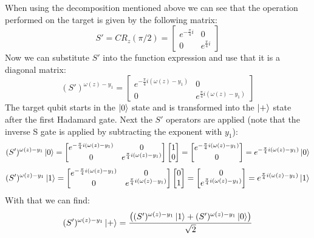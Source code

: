 \documentclass[12pt,a4paper]{article}
\begin{document}
When using the decomposition mentioned above we can see that the operation performed on the target is given by the following matrix:
\[
    S' = CR_z(\pi/2) = \begin{bmatrix}
        e^{-\frac{\pi}{4} i}  & 0\\
        0 & e^{\frac{\pi}{4} i}
    \end{bmatrix}
\]
Now we can substitute \(S'\) into the function expression and use that it is a diagonal matrix:
\[
    (S')^{\omega(z)-y_1} = 
    \begin{bmatrix}
        e^{-\frac{\pi}{4} i(\omega(z)-y_1)}  & 0\\
        0 & e^{\frac{\pi}{4} i(\omega(z)-y_1)}
    \end{bmatrix}
\]
The target qubit starts in the \(\ket{0}\) state and is transformed into the \(\ket{+}\) state after the first Hadamard gate. Next the \(S'\) operators are applied (note that the inverse S gate is applied by subtracting the exponent with \(y_1\)):
\[
(S')^{\omega(z)-y_1}\ket{0} =     \begin{bmatrix}
        e^{-\frac{\pi}{4} i(\omega(z)-y_1)}  & 0\\
        0 & e^{\frac{\pi}{4} i(\omega(z)-y_1)}
    \end{bmatrix} 
    \begin{bmatrix}
        1 \\
        0
    \end{bmatrix} = \begin{bmatrix}
         e^{-\frac{\pi}{4} i(\omega(z)-y_1)}\\
        0
    \end{bmatrix} = e^{-\frac{\pi}{4} i(\omega(z)-y_1)}\ket{0}
\]
\[
(S')^{\omega(z)-y_1}\ket{1} =     \begin{bmatrix}
        e^{-\frac{\pi}{4} i(\omega(z)-y_1)}  & 0\\
        0 & e^{\frac{\pi}{4} i(\omega(z)-y_1)}
    \end{bmatrix} 
    \begin{bmatrix}
        0 \\
        1
    \end{bmatrix} = \begin{bmatrix}
         0\\
        e^{\frac{\pi}{4} i(\omega(z)-y_1)}
    \end{bmatrix} = e^{\frac{\pi}{4} i(\omega(z)-y_1)}\ket{1}
\]
With that we can find:
\[
    (S')^{\omega(z)-y_1}\ket{+} = \frac{\left((S')^{\omega(z)-y_1}\ket{1} + (S')^{\omega(z)-y_1}\ket{0}\right)}{\sqrt{2}} 
    \]
    
\end{document}
